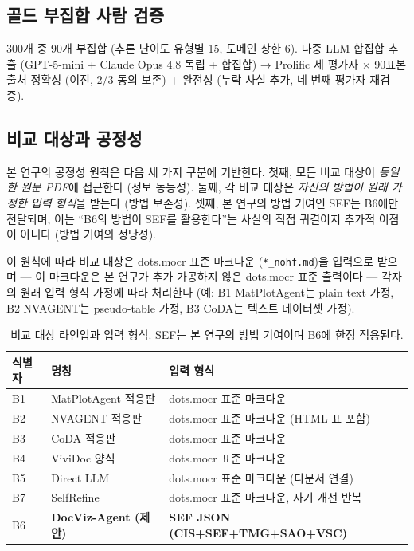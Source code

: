 \documentclass[11pt]{article}
\begin{document}
\subsection{골드 부집합 사람 검증}

300개 중 90개 부집합 (추론 난이도 유형별 15, 도메인 상한 6). 다중 LLM 합집합 추출 (GPT-5-mini + Claude Opus 4.8 독립 + 합집합) → Prolific 세 평가자 × 90표본 출처 정확성 (이진, 2/3 동의 보존) + 완전성 (누락 사실 추가, 네 번째 평가자 재검증).

\subsection{비교 대상과 공정성}
\label{sec:fairness}

본 연구의 공정성 원칙은 다음 세 가지 구분에 기반한다. 첫째, 모든 비교 대상이 \emph{동일한 원문 PDF}에 접근한다 (정보 동등성). 둘째, 각 비교 대상은 \emph{자신의 방법이 원래 가정한 입력 형식}을 받는다 (방법 보존성). 셋째, 본 연구의 방법 기여인 SEF는 B6에만 전달되며, 이는 ``B6의 방법이 SEF를 활용한다''는 사실의 직접 귀결이지 추가적 이점이 아니다 (방법 기여의 정당성).

이 원칙에 따라 비교 대상은 dots.mocr 표준 마크다운 (\texttt{*\_nohf.md})을 입력으로 받으며 — 이 마크다운은 본 연구가 추가 가공하지 않은 dots.mocr 표준 출력이다 — 각자의 원래 입력 형식 가정에 따라 처리한다 (예: B1 MatPlotAgent는 plain text 가정, B2 NVAGENT는 pseudo-table 가정, B3 CoDA는 텍스트 데이터셋 가정).

\begin{table}[h]
\centering
\small
\begin{tabular}{lll}
\toprule
식별자 & 명칭 & 입력 형식 \\
\midrule
B1 & MatPlotAgent 적응판 & dots.mocr 표준 마크다운 \\
B2 & NVAGENT 적응판 & dots.mocr 표준 마크다운 (HTML 표 포함) \\
B3 & CoDA 적응판 & dots.mocr 표준 마크다운 \\
B4 & ViviDoc 양식 & dots.mocr 표준 마크다운 \\
B5 & Direct LLM & dots.mocr 표준 마크다운 (다문서 연결) \\
B7 & SelfRefine & dots.mocr 표준 마크다운, 자기 개선 반복 \\
B6 & \textbf{DocViz-Agent (제안)} & \textbf{SEF JSON (CIS+SEF+TMG+SAO+VSC)} \\
\bottomrule
\end{tabular}
\caption{비교 대상 라인업과 입력 형식. SEF는 본 연구의 방법 기여이며 B6에 한정 적용된다.}
\label{tab:baselines}
\end{table}
\end{document}
